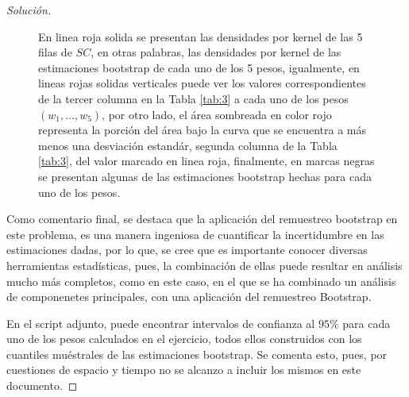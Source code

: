\documentclass[10.5pt,notitlepage]{article}
\renewcommand{\qedsymbol}{$\blacksquare$}
\newenvironment{solucion}
  {\begin{proof}[Solución]}
  {\end{proof}}
\theoremstyle{plain}
\newenvironment{rem}
  {\pushQED{\qed}\renewcommand{\qedsymbol}{$\triangle$}\remarkex}
  {\popQED\endremarkex}
\begin{document}
\begin{solucion}
\begin{figure}[htb]
    \caption{En linea roja solida se presentan las densidades por kernel de las 5 filas de \(SC\), en otras palabras, las densidades por kernel de las estimaciones bootstrap de cada uno de los 5 pesos, igualmente, en lineas rojas solidas verticales puede ver los valores correspondientes de la tercer columna en la Tabla \ref{tab:3} a cada uno de los pesos \((w_1, \hdots, w_5)\), por otro lado, el área sombreada en color rojo representa la porción del área bajo la curva que se encuentra a más menos una desviación estandár, segunda columna de la Tabla \ref{tab:3}, del valor marcado en linea roja, finalmente, en marcas negras se presentan algunas de las estimaciones bootstrap hechas para cada uno de los pesos.}
    \label{fig:2}
\end{figure}
Como comentario final, se destaca que la aplicación del remuestreo bootstrap en este problema, es una manera ingeniosa de cuantificar la incertidumbre en las estimaciones dadas, por lo que, se cree que es importante conocer diversas herramientas estadísticas, pues, la combinación de ellas puede resultar en análisis mucho más completos, como en este caso, en el que se ha combinado un análisis de componenetes principales, con una aplicación del remuestreo Bootstrap. 

\begin{rem}
En el script adjunto, puede encontrar intervalos de confianza al \(95\%\) para cada uno de los pesos calculados en el ejercicio, todos ellos construidos con los cuantiles muéstrales de las estimaciones bootstrap. Se comenta esto, pues, por cuestiones de espacio y tiempo no se alcanzo a incluir los mismos en este documento.
\end{rem}
\end{solucion}

  
\end{document}
